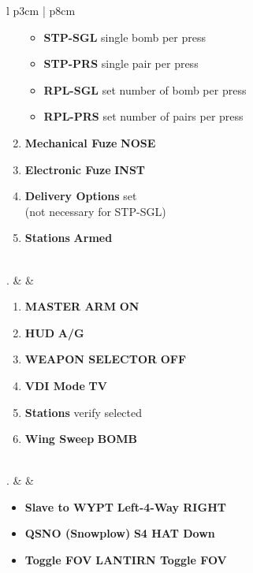 \documentclass[8pt,usenames,dvipsnames,twoside]{article}
\begin{document}
\begin{center}
\begin{longtable}{l p{3cm} | p{8cm}}
\begin{minipage}[t]{\linewidth}
\begin{enumerate}[label=(\alph*)]
						\begin{itemize}
							\item \textbf{STP-SGL} single bomb per press
							\item \textbf{STP-PRS} single pair per press
							\item \textbf{RPL-SGL} set number of bomb per press
							\item \textbf{RPL-PRS} set number of pairs per press
						\end{itemize}
						\item \textbf{Mechanical Fuze} \dotfill \textbf{NOSE}
						\item \textbf{Electronic Fuze} \dotfill \textbf{INST}
						\item \textbf{Delivery Options} \dotfill set \\
						\hfill (not necessary for STP-SGL)
						\item \textbf{Stations} \dotfill \textbf{Armed}
					\end{enumerate}
				\end{minipage} \\
				. &  & 
				\begin{minipage}[t]{\linewidth}
					\vspace{-7pt}
					\begin{enumerate}[label=(\alph*)]
						\item \textbf{MASTER ARM} \dotfill \textbf{ON}
						\item \textbf{HUD} \dotfill \textbf{A/G}
						\item \textbf{WEAPON SELECTOR} \dotfill \textbf{OFF}
						\item \textbf{VDI Mode} \dotfill \textbf{TV}
						\item \textbf{Stations} \dotfill verify selected
						\item \textbf{Wing Sweep} \dotfill \textbf{BOMB}
					\end{enumerate} 
				\end{minipage} \\
				. &  & 
				\begin{minipage}[t]{\linewidth}
					\vspace{-7pt}
					\begin{itemize}
						\item \textbf{Slave to WYPT} \dotfill \textbf{Left-4-Way RIGHT}
						\item \textbf{QSNO (Snowplow)} \dotfill \textbf{S4 HAT Down}
						\item \textbf{Toggle FOV} \dotfill \textbf{LANTIRN Toggle FOV}

\end{itemize}
\end{minipage}
\end{longtable}
\end{center}
\end{document}
